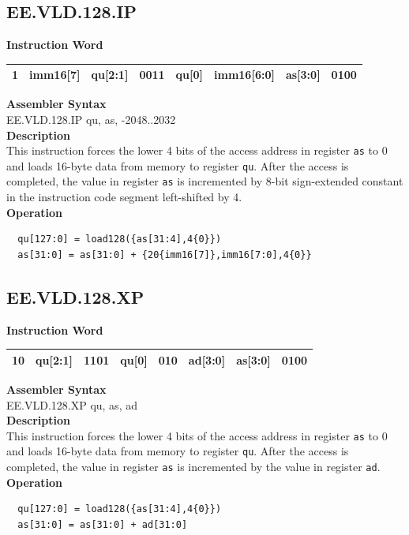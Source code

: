 \clearpage
\subsection{EE.VLD.128.IP}\label{instruction:EEVLD128IP}
\setlength\tabcolsep{6pt}
\textbf{Instruction Word} \\
\begin{tabular}{|c|c|c|c|c|c|c|c|}
	\hline
	1 & imm16[7] & qu[2:1] & 0011 & qu[0] & imm16[6:0] & as[3:0] & 0100 \\
	\hline
\end{tabular}

\textbf{Assembler Syntax} \\
EE.VLD.128.IP qu, as, -2048..2032 \\
\textbf{Description} \\
This instruction forces the lower 4 bits of the access address in register \lstinline{as} to 0 and loads 16-byte data from memory to register \lstinline{qu}. After the access is completed, the value in register \lstinline{as} is incremented by 8-bit sign-extended constant in the instruction code segment left-shifted by 4.\\
\textbf{Operation}
\begin{lstlisting}
  qu[127:0] = load128({as[31:4],4{0}})
  as[31:0] = as[31:0] + {20{imm16[7]},imm16[7:0],4{0}}
\end{lstlisting}

\clearpage
\subsection{EE.VLD.128.XP}\label{instruction:EEVLD128XP}
\setlength\tabcolsep{6pt}
\textbf{Instruction Word} \\
\begin{tabular}{|c|c|c|c|c|c|c|c|}
	\hline
	10 & qu[2:1] & 1101 & qu[0] & 010 & ad[3:0] & as[3:0] & 0100 \\
	\hline
\end{tabular}

\textbf{Assembler Syntax} \\
EE.VLD.128.XP qu, as, ad \\
\textbf{Description} \\
This instruction forces the lower 4 bits of the access address in register \lstinline{as} to 0 and loads 16-byte data from memory to register \lstinline{qu}. After the access is completed, the value in register \lstinline{as} is incremented by the value in register \lstinline{ad}.\\
\textbf{Operation}
\begin{lstlisting}
  qu[127:0] = load128({as[31:4],4{0}})
  as[31:0] = as[31:0] + ad[31:0]
\end{lstlisting}

